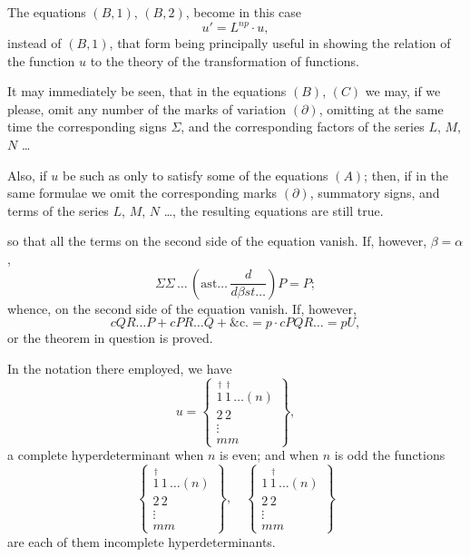 \documentclass[11pt,a4paper]{article}
\theoremstyle{plain}
\theoremstyle{definition}
\theoremstyle{remark}
\begin{document}
\newpage

The equations $(B, 1)$, $(B, 2)$, become in this case
\[
u' = L^{np}\cdot u
\tag{B, 3},
\]
instead of $(B, 1)$, that form being principally useful in showing the relation of the
function $u$ to the theory of the transformation of functions.

It may immediately be seen, that in the equations $(B)$, $(C)$ we may, if we please,
omit any number of the marks of variation $(\partial)$, omitting at the same time the
corresponding signs $\Sigma$, and the corresponding factors of the series $L$, $M$, $N$ \ldots

Also, if $u$ be such as only to satisfy some of the equations $(A)$; then, if in the
same formulae we omit the corresponding marks $(\partial)$, summatory signs, and terms of the
series $L$, $M$, $N$ \ldots, the resulting equations are still true.

so that all the terms on the second side of the equation vanish. If, however, $\beta=\alpha$,
\[
\Sigma\Sigma\,\ldots\,\left(\mathrm{ast}\ldots\,\dfrac{d}{d\beta st\ldots}\right)P = P;
\]
whence, on the second side of the equation vanish. If, however,
\[
cQR\ldots P + cPR\ldots Q + \&\text{c.} = p\cdot cPQR\ldots = pU,
\]
or the theorem in question is proved.

In the notation there employed, we have
\[
u =
\left\{
\begin{array}{c}
\stackrel{\dagger}{1}\,\stackrel{\dagger}{1}\,\ldots(n) \\[2pt]
\hline
2\,2 \\
\vdots \\
mm
\end{array}
\right\},
\]
a complete hyperdeterminant when $n$ is even; and when $n$ is odd the functions
\[
\left\{
\begin{array}{c}
\stackrel{\dagger}{1}\,1\,\ldots(n) \\[2pt]
\hline
2\,2 \\
\vdots \\
mm
\end{array}
\right\},
\quad
\left\{
\begin{array}{c}
1\,\stackrel{\dagger}{1}\,\ldots(n) \\[2pt]
\hline
2\,2 \\
\vdots \\
mm
\end{array}
\right\}
\]
are each of them incomplete hyperdeterminants.
\end{document}

